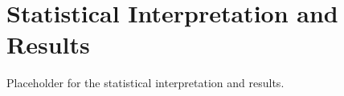 \chapter{Statistical Interpretation and Results}
\label{ch:results}

Placeholder for the statistical interpretation and results.
